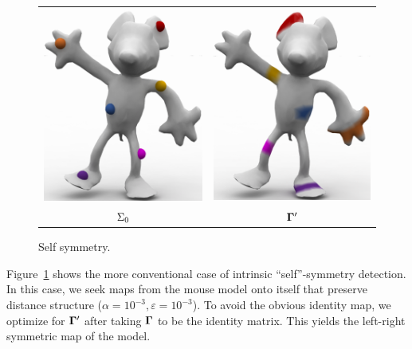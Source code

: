 \setlength{\columnsep}{2pt}
\begin{figure}\centering
\vspace{-.2in}
\begin{tabular}{c@{}c}
\includegraphics[height=.6\linewidth]{figures/symmetry/source_symmetric_mouse_cropped.pdf}&
\includegraphics[height=.6\linewidth]{figures/symmetry/target_symmetric_mouse_cropped.pdf}\\
$\Sigma_0$ & $\mathbf \Gamma'$
\end{tabular}
\vspace{-.17in}
\caption{Self symmetry.}\label{fig:self-symmetry}
\end{figure}
Figure~\ref{fig:self-symmetry} shows the more conventional case of intrinsic ``self''-symmetry detection.  In this case, we seek maps from the mouse model onto itself that preserve distance structure ($\alpha\!=\!10^{-3},\varepsilon\!=\!10^{-3}$).  To avoid the obvious identity map, we optimize for $\mathbf \Gamma'$ after taking $\mathbf \Gamma$ to be the identity matrix.  This yields the left-right symmetric map of the model.

